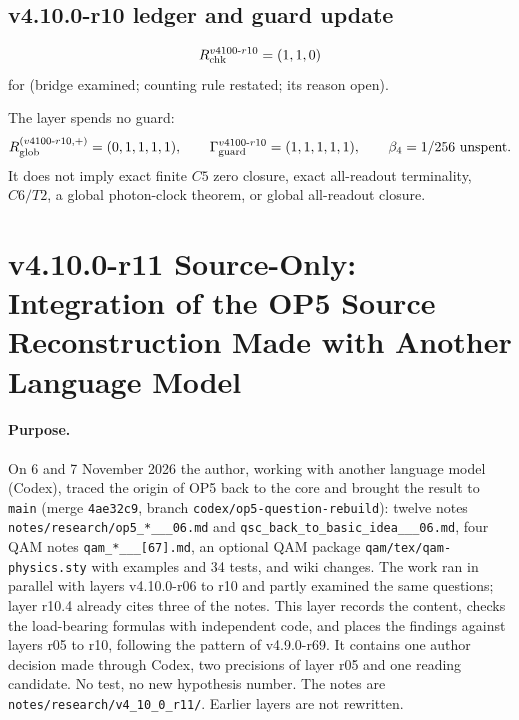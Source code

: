 \subsection*{v4.10.0-r10 ledger and guard update}
\label{subsec:v4100-r10-ledger-guard}

\[
R_{\rm chk}^{v4100\text{-}r10}=(1,1,0)
\]
for (bridge examined; counting rule restated; its reason open).

The layer spends no guard:
\[
R_{\rm glob}^{(v4100\text{-}r10,+)}=(0,1,1,1,1),
\qquad
\Gamma_{\rm guard}^{v4100\text{-}r10}=(1,1,1,1,1),
\qquad
\beta_4=1/256\ \text{unspent}.
\]
It does not imply exact finite \(C5\) zero closure, exact all-readout terminality,
\(C6/T2\), a global photon-clock theorem, or global all-readout closure.

\clearpage
\section*{v4.10.0-r11 Source-Only: Integration of the OP5 Source Reconstruction Made with Another Language Model}
\label{sec:v4100-r11-op5-reconstruction}

\paragraph{Purpose.}
On 6 and 7 November 2026 the author, working with another language model (Codex), traced the origin of OP5 back to the core and brought the result to
\texttt{main} (merge \texttt{4ae32c9}, branch \texttt{codex/\allowbreak op5-\allowbreak question-\allowbreak rebuild}): twelve notes
\texttt{notes/\allowbreak research/\allowbreak op5\_*\_\_\_\allowbreak 06.md} and
\texttt{qsc\_\allowbreak back\_\allowbreak to\_\allowbreak basic\_\allowbreak idea\_\_\_\allowbreak 06.md}, four QAM notes
\texttt{qam\_*\_\_\_[67].md}, an optional QAM package \texttt{qam/\allowbreak tex/\allowbreak qam-physics.sty} with examples
and 34 tests, and wiki changes.  The work ran in parallel with layers v4.10.0-r06 to r10 and partly examined the same questions; layer r10.4 already cites three
of the notes.  This layer records the content, checks the load-bearing formulas with independent code, and places the findings against layers r05 to
r10, following the pattern of v4.9.0-r69.  It contains one author decision made through Codex, two precisions of layer r05 and one reading candidate.  No
test, no new hypothesis number.  The notes are \texttt{notes/\allowbreak research/\allowbreak v4\_10\_0\_r11/}.  Earlier layers are not rewritten.

